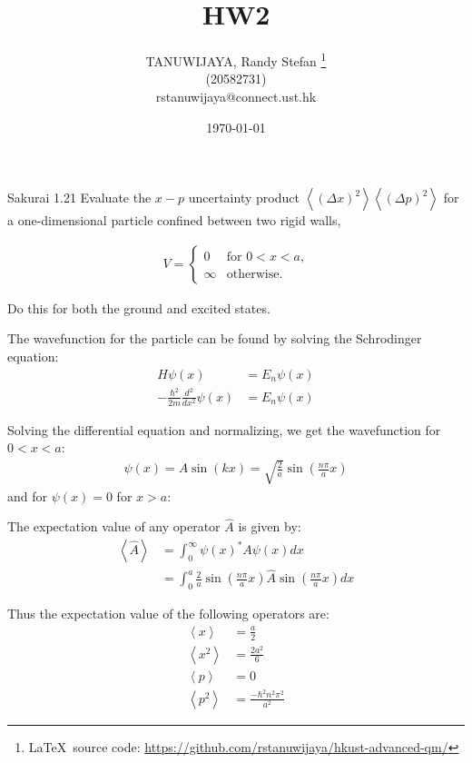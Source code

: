 \documentclass{article}
\title{HW2}
\author{TANUWIJAYA, Randy Stefan \footnote{\LaTeX\ source code: \url{https://github.com/rstanuwijaya/hkust-advanced-qm/}}
\\ (20582731) \\ rstanuwijaya@connect.ust.hk}
\affil{Department of Physics - HKUST}
\date{\today}
\begin{document}
	\maketitle
	\newcommand{\expc}[1]{\left<#1\right>}
	\begin{section}{Sakurai 1.21}
		\newcommand{\wf}{\sin \left( \frac{n \pi}{a} x \right)}
		Evaluate the $x-p$ uncertainty product $\expc{(\Delta x)^2} \expc{(\Delta p)^2}$ for a one-dimensional particle confined between two rigid walls,

		\begin{align*}
			V = \begin{cases}
				0 & \text{for $0 < x < a$,} \\
				\infty & \text{otherwise.}
			\end{cases}
		\end{align*}

		Do this for both the ground and excited states.
		\begin{tcolorbox}[breakable]
			The wavefunction for the particle can be found by solving the Schrodinger equation:
			\begin{align*}
				H \psi(x) &= E_n \psi(x) \\
				- \frac{\hbar^2}{2m} \frac{d^2}{dx^2} \psi(x) &= E_n \psi(x) 
			\end{align*}
			
			Solving the differential equation and normalizing, we get the wavefunction for $0 < x < a$:
			\begin{align*}
				\psi(x) = A \sin \left( k x \right) = \sqrt{\frac{2}{a}} \wf
			\end{align*}
			and for $\psi(x) = 0$ for $x > a$:

			The expectation value of any operator $\hat A$ is given by:
			\begin{align*}
				\expc{\hat A} &= \int_0^\infty \psi(x)^* A \psi(x) dx \\
				&= \int_0^a \frac{2}{a} \wf \hat A \wf dx  
			\end{align*}

			Thus the expectation value of the following operators are:
			\begin{align*}
				\expc{x} &= \frac{a}{2} \\
				\expc{x^2} &= \frac{2a^2}{6} \\
				\expc{p} &= 0 \\
				\expc{p^2} &= \frac{-\hbar^2 n^2 \pi^2}{a^2}
			\end{align*}


\end{tcolorbox}
\end{section}
\end{document}
